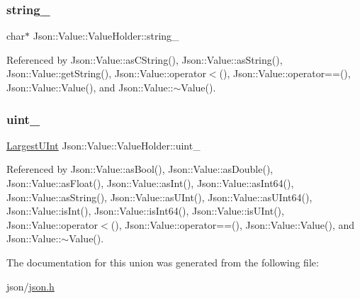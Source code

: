 \subsubsection{\texorpdfstring{string\+\_\+}{string\_}}
{\footnotesize\ttfamily char$\ast$ Json\+::\+Value\+::\+Value\+Holder\+::string\+\_\+}



Referenced by Json\+::\+Value\+::as\+C\+String(), Json\+::\+Value\+::as\+String(), Json\+::\+Value\+::get\+String(), Json\+::\+Value\+::operator$<$(), Json\+::\+Value\+::operator==(), Json\+::\+Value\+::\+Value(), and Json\+::\+Value\+::$\sim$\+Value().

\mbox{\label{unionJson_1_1Value_1_1ValueHolder_aab65665dc15a24a29a8e93cdeeaa7e50_aab65665dc15a24a29a8e93cdeeaa7e50}} 
\subsubsection{\texorpdfstring{uint\+\_\+}{uint\_}}
{\footnotesize\ttfamily \hyperlink{classJson_1_1Value_a6682a3684d635e03fc06ba229fa24eec_a6682a3684d635e03fc06ba229fa24eec}{Largest\+U\+Int} Json\+::\+Value\+::\+Value\+Holder\+::uint\+\_\+}



Referenced by Json\+::\+Value\+::as\+Bool(), Json\+::\+Value\+::as\+Double(), Json\+::\+Value\+::as\+Float(), Json\+::\+Value\+::as\+Int(), Json\+::\+Value\+::as\+Int64(), Json\+::\+Value\+::as\+String(), Json\+::\+Value\+::as\+U\+Int(), Json\+::\+Value\+::as\+U\+Int64(), Json\+::\+Value\+::is\+Int(), Json\+::\+Value\+::is\+Int64(), Json\+::\+Value\+::is\+U\+Int(), Json\+::\+Value\+::operator$<$(), Json\+::\+Value\+::operator==(), Json\+::\+Value\+::\+Value(), and Json\+::\+Value\+::$\sim$\+Value().



The documentation for this union was generated from the following file\+:\begin{DoxyCompactItemize}
\item 
json/\hyperlink{json_8h}{json.\+h}\end{DoxyCompactItemize}
